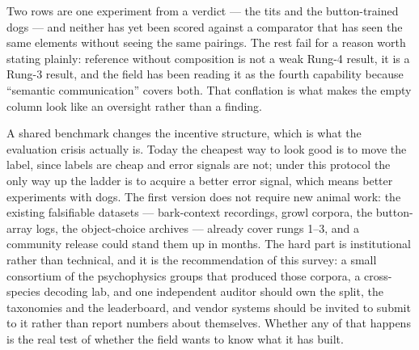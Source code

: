 Two rows are one experiment from a verdict --- the tits and the button-trained
dogs --- and neither has yet been scored against a comparator that has seen
the same elements without seeing the same pairings. The rest fail for a reason
worth stating plainly: reference without composition is not a weak Rung-4
result, it is a Rung-3 result, and the field has been reading it as the fourth
capability because ``semantic communication'' covers both. That conflation is
what makes the empty column look like an oversight rather than a finding.


A shared benchmark changes the incentive structure, which is what the
evaluation crisis actually is. Today the cheapest way to look good is to move
the label, since labels are cheap and error signals are not; under this
protocol the only way up the ladder is to acquire a better error signal, which
means better experiments with dogs. The first version does not require new
animal work: the existing falsifiable datasets --- bark-context recordings,
growl corpora, the button-array logs, the object-choice archives --- already
cover rungs 1--3, and a community release could stand them up in months. The
hard part is institutional rather than technical, and it is the recommendation
of this survey: a small consortium of the psychophysics groups
that produced those corpora, a cross-species decoding lab, and one independent
auditor should own the split, the taxonomies and the leaderboard, and vendor
systems should be invited to submit to it rather than report numbers about
themselves. Whether any of that happens is the real test of whether the field
wants to know what it has built.
